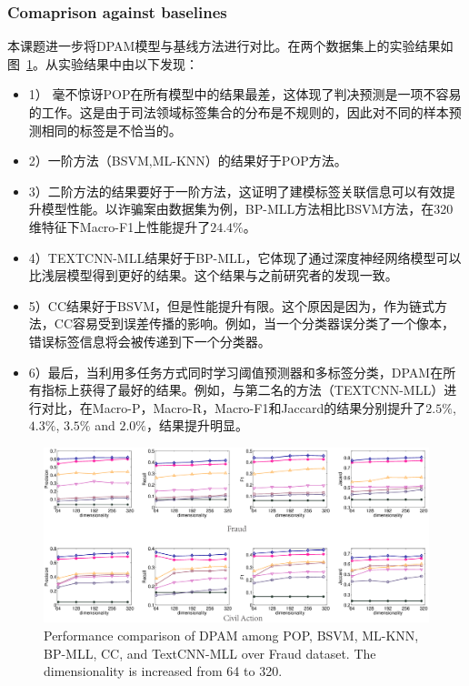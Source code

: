 \subsubsection{Comaprison against baselines}
本课题进一步将DPAM模型与基线方法进行对比。在两个数据集上的实验结果如图~\ref{fig:comMain}。从实验结果中由以下发现：
\begin{itemize}
    \item 1） 毫不惊讶POP在所有模型中的结果最差，这体现了判决预测是一项不容易的工作。这是由于司法领域标签集合的分布是不规则的，因此对不同的样本预测相同的标签是不恰当的。
    \item 2）一阶方法（BSVM,ML-KNN）的结果好于POP方法。
    \item 3）二阶方法的结果要好于一阶方法，这证明了建模标签关联信息可以有效提升模型性能。以诈骗案由数据集为例，BP-MLL方法相比BSVM方法，在320维特征下Macro-F1上性能提升了$24.4\%$。
    \item 4）TEXTCNN-MLL结果好于BP-MLL，它体现了通过深度神经网络模型可以比浅层模型得到更好的结果。这个结果与之前研究者的发现一致\cite{Kim14}。
    \item 5）CC结果好于BSVM，但是性能提升有限。这个原因是因为，作为链式方法，CC容易受到误差传播的影响\cite{KubatSD10}。例如，当一个分类器误分类了一个像本，错误标签信息将会被传递到下一个分类器。
    \item 6）最后，当利用多任务方式同时学习阈值预测器和多标签分类，DPAM在所有指标上获得了最好的结果。例如，与第二名的方法（TEXTCNN-MLL）进行对比，在Macro-P，Macro-R，Macro-F1和Jaccard的结果分别提升了$2.5\%$, $4.3\%$, $3.5\%$ and $2.0\%$，结果提升明显。
\end{itemize}
\begin{figure}[htbp]
\centering
\includegraphics[scale=0.25, clip=true]{./sources/comMain.eps}
\caption{\label{fig:comMain}Performance comparison of DPAM among POP, BSVM, ML-KNN, BP-MLL, CC, and TextCNN-MLL over Fraud dataset. The dimensionality is increased from 64 to 320.}
\end{figure}

